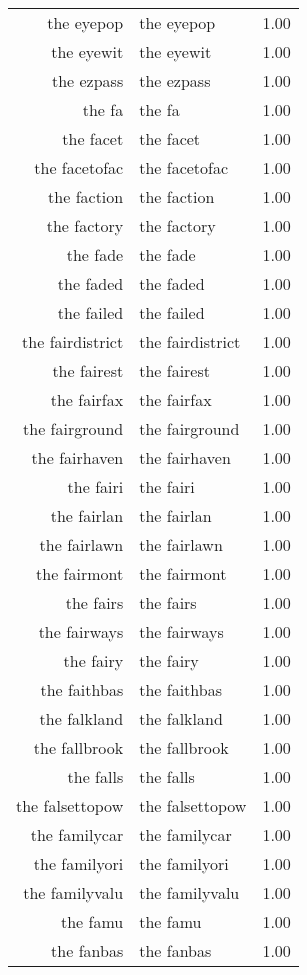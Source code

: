\begin{table}[ht]
\begin{tabular}{rlr}
  the eyepop & the eyepop & 1.00 \\ 
  the eyewit & the eyewit & 1.00 \\ 
  the ezpass & the ezpass & 1.00 \\ 
  the fa & the fa & 1.00 \\ 
  the facet & the facet & 1.00 \\ 
  the facetofac & the facetofac & 1.00 \\ 
  the faction & the faction & 1.00 \\ 
  the factory & the factory & 1.00 \\ 
  the fade & the fade & 1.00 \\ 
  the faded & the faded & 1.00 \\ 
  the failed & the failed & 1.00 \\ 
  the fairdistrict & the fairdistrict & 1.00 \\ 
  the fairest & the fairest & 1.00 \\ 
  the fairfax & the fairfax & 1.00 \\ 
  the fairground & the fairground & 1.00 \\ 
  the fairhaven & the fairhaven & 1.00 \\ 
  the fairi & the fairi & 1.00 \\ 
  the fairlan & the fairlan & 1.00 \\ 
  the fairlawn & the fairlawn & 1.00 \\ 
  the fairmont & the fairmont & 1.00 \\ 
  the fairs & the fairs & 1.00 \\ 
  the fairways & the fairways & 1.00 \\ 
  the fairy & the fairy & 1.00 \\ 
  the faithbas & the faithbas & 1.00 \\ 
  the falkland & the falkland & 1.00 \\ 
  the fallbrook & the fallbrook & 1.00 \\ 
  the falls & the falls & 1.00 \\ 
  the falsettopow & the falsettopow & 1.00 \\ 
  the familycar & the familycar & 1.00 \\ 
  the familyori & the familyori & 1.00 \\ 
  the familyvalu & the familyvalu & 1.00 \\ 
  the famu & the famu & 1.00 \\ 
  the fanbas & the fanbas & 1.00 \\ 

\end{tabular}
\end{table}
